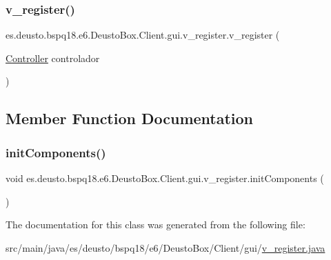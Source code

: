 \subsubsection{\texorpdfstring{v\+\_\+register()}{v\_register()}}
{\footnotesize\ttfamily es.\+deusto.\+bspq18.\+e6.\+Deusto\+Box.\+Client.\+gui.\+v\+\_\+register.\+v\+\_\+register (\begin{DoxyParamCaption}\item[{\mbox{\hyperlink{classes_1_1deusto_1_1bspq18_1_1e6_1_1_deusto_box_1_1_client_1_1controller_1_1_controller}{Controller}}}]{controlador }\end{DoxyParamCaption})}



\subsection{Member Function Documentation}
\mbox{\label{classes_1_1deusto_1_1bspq18_1_1e6_1_1_deusto_box_1_1_client_1_1gui_1_1v__register_adb568ac6c8d54fc3466930889615af8c}} 
\subsubsection{\texorpdfstring{init\+Components()}{initComponents()}}
{\footnotesize\ttfamily void es.\+deusto.\+bspq18.\+e6.\+Deusto\+Box.\+Client.\+gui.\+v\+\_\+register.\+init\+Components (\begin{DoxyParamCaption}{ }\end{DoxyParamCaption})}



The documentation for this class was generated from the following file\+:\begin{DoxyCompactItemize}
\item 
src/main/java/es/deusto/bspq18/e6/\+Deusto\+Box/\+Client/gui/\mbox{\hyperlink{v__register_8java}{v\+\_\+register.\+java}}\end{DoxyCompactItemize}
